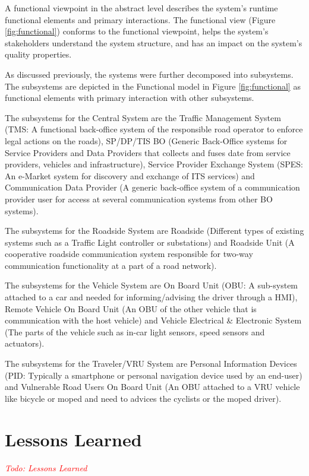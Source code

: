 \documentclass[conference]{IEEEtran}
\newcommand{\todo}[1]{\textcolor{red}{\emph{Todo: #1}}}
\begin{document}
A functional viewpoint in the abstract level describes the system's runtime functional elements and primary interactions. The functional view (Figure \ref{fig:functional}) conforms to the functional viewpoint, helps the system's stakeholders understand the system structure, and has an impact on the system's quality properties.

As discussed previously, the systems were further decomposed into subsystems. The subsystems are depicted in the Functional model in Figure \ref{fig:functional} as functional elements with primary interaction with other subsystems. 

The subsystems for the Central System are the Traffic Management System (TMS: A functional back-office system of the responsible road operator to enforce legal actions on the roads), SP/DP/TIS BO (Generic Back-Office systems for Service Providers and Data Providers that collects and fuses date from service providers, vehicles and infrastructure), Service Provider Exchange System (SPES: An e-Market system for discovery and exchange of ITS services) and Communication Data Provider (A generic back-office system of a communication provider user for access at several communication systems from other BO systems).

The subsystems for the Roadside System are Roadside (Different types of existing systems such as a Traffic Light controller or substations) and Roadside Unit (A cooperative roadside communication system responsible for two-way communication functionality at a part of a road network).

The subsystems for the Vehicle System are On Board Unit (OBU: A sub-system attached to a car and needed for informing/advising the driver through a HMI), Remote Vehicle On Board Unit (An OBU of the other vehicle that is communication with the host vehicle) and Vehicle Electrical \& Electronic System (The parts of the vehicle such as in-car light sensors, speed sensors and actuators).

The subsystems for the Traveler/VRU System are Personal Information Devices (PID: Typically a smartphone or personal navigation device used by an end-user) and Vulnerable Road Users On Board Unit (An OBU attached to a VRU vehicle like bicycle or moped and need to advices the cyclists or the moped driver).

\section{Lessons Learned}
\todo{Lessons Learned}
\end{document}
